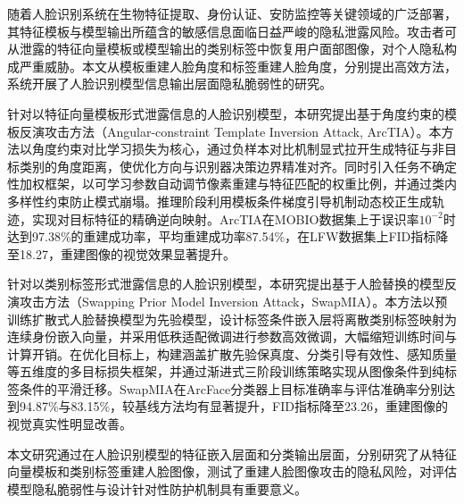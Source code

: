 \begin{cabstract}
随着人脸识别系统在生物特征提取、身份认证、安防监控等关键领域的广泛部署，其特征模板与模型输出所蕴含的敏感信息面临日益严峻的隐私泄露风险。攻击者可从泄露的特征向量模板或模型输出的类别标签中恢复用户面部图像，对个人隐私构成严重威胁。本文从模板重建人脸角度和标签重建人脸角度，分别提出高效方法，系统开展了人脸识别模型信息输出层面隐私脆弱性的研究。

针对以特征向量模板形式泄露信息的人脸识别模型，本研究提出基于角度约束的模板反演攻击方法（Angular-constraint Template Inversion Attack, ArcTIA）。本方法以角度约束对比学习损失为核心，通过负样本对比机制显式拉开生成特征与非目标类别的角度距离，使优化方向与识别器决策边界精准对齐。同时引入任务不确定性加权框架，以可学习参数自动调节像素重建与特征匹配的权重比例，并通过类内多样性约束防止模式崩塌。推理阶段利用模板条件梯度引导机制动态校正生成轨迹，实现对目标特征的精确逆向映射。ArcTIA在MOBIO数据集上于误识率$10^{-2}$时达到97.38\%的重建成功率，平均重建成功率87.54\%，在LFW数据集上FID指标降至18.27，重建图像的视觉效果显著提升。

针对以类别标签形式泄露信息的人脸识别模型，本研究提出基于人脸替换的模型反演攻击方法（Swapping Prior Model Inversion Attack，SwapMIA）。本方法以预训练扩散式人脸替换模型为先验模型，设计标签条件嵌入层将离散类别标签映射为连续身份嵌入向量，并采用低秩适配微调进行参数高效微调，大幅缩短训练时间与计算开销。在优化目标上，构建涵盖扩散先验保真度、分类引导有效性、感知质量等五维度的多目标损失框架，并通过渐进式三阶段训练策略实现从图像条件到纯标签条件的平滑迁移。SwapMIA在ArcFace分类器上目标准确率与评估准确率分别达到94.87\%与83.15\%，较基线方法均有显著提升，FID指标降至23.26，重建图像的视觉真实性明显改善。

本文研究通过在人脸识别模型的特征嵌入层面和分类输出层面，分别研究了从特征向量模板和类别标签重建人脸图像，测试了重建人脸图像攻击的隐私风险，对评估模型隐私脆弱性与设计针对性防护机制具有重要意义。
\end{cabstract}

